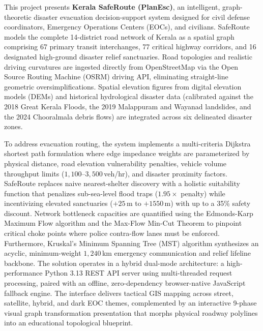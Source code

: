 \documentclass[12pt,oneside]{report}
\begin{document}
This project presents \textbf{Kerala SafeRoute (PlanEsc)}, an intelligent, graph-theoretic disaster evacuation decision-support system designed for civil defense coordinators, Emergency Operations Centers (EOCs), and civilians. SafeRoute models the complete 14-district road network of Kerala as a spatial graph comprising 67 primary transit interchanges, 77 critical highway corridors, and 16 designated high-ground disaster relief sanctuaries. Road topologies and realistic driving curvatures are ingested directly from OpenStreetMap via the Open Source Routing Machine (OSRM) driving API, eliminating straight-line geometric oversimplifications. Spatial elevation figures from digital elevation models (DEMs) and historical hydrological disaster data (calibrated against the 2018 Great Kerala Floods, the 2019 Malappuram and Wayanad landslides, and the 2024 Chooralmala debris flows) are integrated across six delineated disaster zones.

To address evacuation routing, the system implements a multi-criteria Dijkstra shortest path formulation where edge impedance weights are parameterized by physical distance, road elevation vulnerability penalties, vehicle volume throughput limits ($1,100$--$3,500$\,veh/hr), and disaster proximity factors. SafeRoute replaces naive nearest-shelter discovery with a holistic suitability function that penalizes sub-sea-level flood traps ($1.95\times$ penalty) while incentivizing elevated sanctuaries ($+25$\,m to $+1550$\,m) with up to a 35\% safety discount. Network bottleneck capacities are quantified using the Edmonds-Karp Maximum Flow algorithm and the Max-Flow Min-Cut Theorem to pinpoint critical choke points where police contra-flow lanes must be enforced. Furthermore, Kruskal's Minimum Spanning Tree (MST) algorithm synthesizes an acyclic, minimum-weight $1,240$\,km emergency communication and relief lifeline backbone. The solution operates in a hybrid dual-mode architecture: a high-performance Python 3.13 REST API server using multi-threaded request processing, paired with an offline, zero-dependency browser-native JavaScript fallback engine. The interface delivers tactical GIS mapping across street, satellite, hybrid, and dark EOC themes, complemented by an interactive 9-phase visual graph transformation presentation that morphs physical roadway polylines into an educational topological blueprint.
\clearpage
\end{document}
